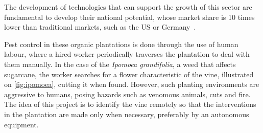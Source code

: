 \documentclass[
	12pt,				%
	oneside,			%
	a4paper,			%
	brazil,			    %
	french,				%
	spanish,			%
	english,			%
	]{abntex2}
\begin{document}
  The development of technologies that can support the growth of this sector are fundamental to develop their national potential, whose market share is 10 times lower than traditional markets, such as the US or Germany~\cite{organicos_carta_capital}.
  


  Pest control in these organic plantations is done through the use of human labour, where a hired worker periodically traverses the plantation to deal with them manually. In the case of the \textit{Ipomoea grandifolia}, a weed that affects sugarcane, the worker searches for a flower characteristic of the vine, illustrated on \autoref{fig:ipomoea}, cutting it when found. However, such planting environments are aggressive to humans, posing hazards such as venomous animals, cuts and fire. The idea of this project is to identify the vine remotely so that the interventions in the plantation are made only when necessary, preferably by an autonomous equipment.
  
\end{document}
